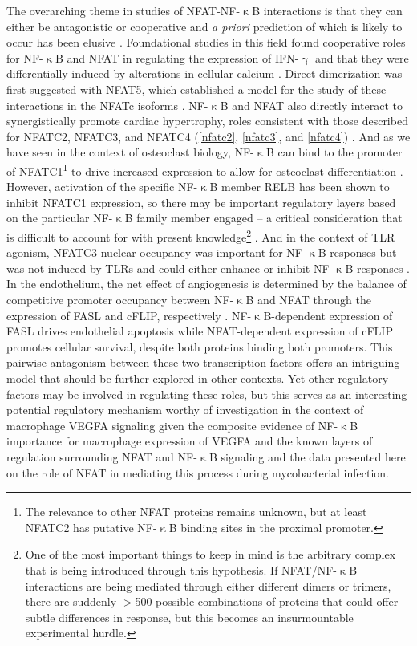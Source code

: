 The overarching theme in studies of NFAT\hyp{}NF\hyp{}$\upkappa$B interactions is that they can either be antagonistic or cooperative and \textit{a priori} prediction of which is likely to occur has been elusive \citep{Khalaf2013, Fisher2006}. Foundational studies in this field found cooperative roles for NF\hyp{}$\upkappa$B and NFAT in regulating the expression of IFN\hyp{}$\upgamma$ \citep{Sica1997} and that they were differentially induced by alterations in cellular calcium \citep{Dolmetsch1997}. Direct dimerization was first suggested with NFAT5, which established a model for the study of these interactions in the NFATc isoforms \citep{LopezRodriguez2001}. NF\hyp{}$\upkappa$B and NFAT also directly interact to synergistically promote cardiac hypertrophy, roles consistent with those described for NFATC2, NFATC3, and NFATC4 (\autoref{nfatc2}, \autoref{nfatc3}, and \autoref{nfatc4}) \citep{Liu2012}. And as we have seen in the context of osteoclast biology, NF\hyp{}$\upkappa$B can bind to the promoter of NFATC1\footnote{The relevance to other NFAT proteins remains unknown, but at least NFATC2 has putative NF\hyp{}$\upkappa$B binding sites in the proximal promoter.} to drive increased expression to allow for osteoclast differentiation \citep{Asagiri2005}. However, activation of the specific NF\hyp{}$\upkappa$B member RELB has been shown to inhibit NFATC1 expression, so there may be important regulatory layers based on the particular NF\hyp{}$\upkappa$B family member engaged -- a critical consideration that is difficult to account for with present knowledge\footnote{One of the most important things to keep in mind is the arbitrary complex that is being introduced through this hypothesis. If NFAT/NF-$\upkappa$B interactions are being mediated through either different dimers or trimers, there are suddenly $>$500 possible combinations of proteins that could offer subtle differences in response, but this becomes an insurmountable experimental hurdle.} \citep{Zhao2015}. And in the context of TLR agonism, NFATC3 nuclear occupancy was important for NF\hyp{}$\upkappa$B responses but was not induced by TLRs and could either enhance or inhibit NF\hyp{}$\upkappa$B responses \citep{Minematsu2011, Conboy1999}. In the endothelium, the net effect of angiogenesis is determined by the balance of competitive promoter occupancy between NF\hyp{}$\upkappa$B and NFAT through the expression of FASL and cFLIP, respectively \citep{Aurora2010}. NF\hyp{}$\upkappa$B\hyp{}dependent expression of FASL drives endothelial apoptosis while NFAT\hyp{}dependent expression of cFLIP promotes cellular survival, despite both proteins binding both promoters. This pairwise antagonism between these two transcription factors offers an intriguing model that should be further explored in other contexts. Yet other regulatory factors may be involved in regulating these roles, but this serves as an interesting potential regulatory mechanism worthy of investigation in the context of macrophage VEGFA signaling given the composite evidence of NF\hyp{}$\upkappa$B importance for macrophage expression of VEGFA and the known layers of regulation surrounding NFAT and NF\hyp{}$\upkappa$B signaling and the data presented here on the role of NFAT in mediating this process during mycobacterial infection.

